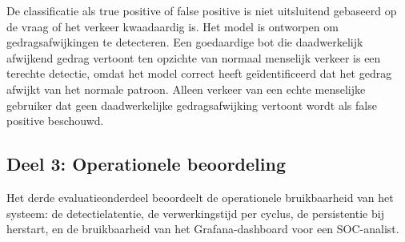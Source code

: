 De classificatie als true positive of false positive is niet uitsluitend gebaseerd op de vraag of het verkeer kwaadaardig is. Het model is ontworpen om gedragsafwijkingen te detecteren. Een goedaardige bot die daadwerkelijk afwijkend gedrag vertoont ten opzichte van normaal menselijk verkeer is een terechte detectie, omdat het model correct heeft geïdentificeerd dat het gedrag afwijkt van het normale patroon. Alleen verkeer van een echte menselijke gebruiker dat geen daadwerkelijke gedragsafwijking vertoont wordt als false positive beschouwd.
 
\subsection{Deel 3: Operationele beoordeling}
\label{subsec:eval-operationele-beoordeling}
 
Het derde evaluatieonderdeel beoordeelt de operationele bruikbaarheid van het systeem: de detectielatentie, de verwerkingstijd per cyclus, de persistentie bij herstart, en de bruikbaarheid van het Grafana-dashboard voor een SOC-analist.